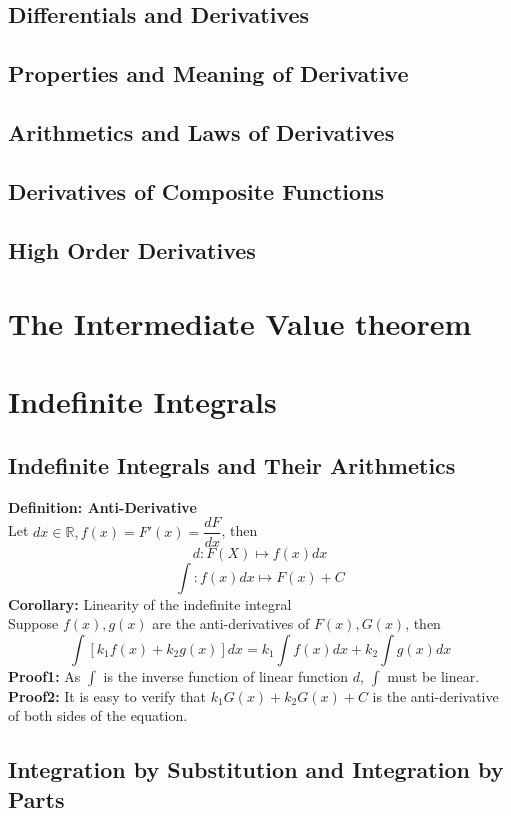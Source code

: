 \documentclass{article}
\newcommand{\R}{\mathbb{R}}
\newcommand{\0}{{\bf{0}}}
\begin{document}
\subsection{Differentials and Derivatives}
\subsection{Properties and Meaning of Derivative}
\subsection{Arithmetics and Laws of Derivatives}
\subsection{Derivatives of Composite Functions}
\subsection{High Order Derivatives}
\section{The Intermediate Value theorem}
\section{Indefinite Integrals}
\subsection{Indefinite Integrals and Their Arithmetics}
\textbf{Definition: Anti-Derivative}\\
Let $dx\in\R,f(x)=F'(x)=\dfrac{dF}{dx}$, then
$$d:F(X)\mapsto f(x)dx$$
$$\int:f(x)dx\mapsto F(x)+C$$
\textbf{Corollary:} Linearity of the indefinite integral\\
Suppose $f(x),g(x)$ are the anti-derivatives of $F(x),G(x)$, then
$$\int[k_1f(x)+k_2g(x)]dx=k_1\int f(x)dx+k_2\int g(x)dx$$
\textbf{Proof1:} As $\int$ is the inverse function of linear function $d$, $\int$ must be linear.\\
\textbf{Proof2:} It is easy to verify that $k_1G(x)+k_2G(x)+C$ is the anti-derivative of both sides of the equation.
\subsection{Integration by Substitution and Integration by Parts}
\end{document}
